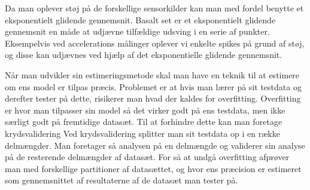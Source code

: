 \begin{description}[style=nextline]
\item[Eksponentielt glidende gennemsnit]
Da man oplever støj på de forskellige sensorkilder kan man med fordel benytte et eksponentielt glidende gennemsnit.
Basalt set er et eksponentielt glidende gennemsnit en måde at udjævne tilfældige udsving i en serie af punkter.
Eksempelvis ved accelerations målinger oplever vi enkelte spikes på grund af støj, og disse kan udjævnes ved hjælp af det eksponentielle glidende gennemsnit.

\item[Krydsvalidering]
Når man udvikler sin estimeringsmetode skal man have en teknik til at estimere om ens model er tilpas præcis.
Problemet er at hvis man lærer på sit testdata og derefter tester på dette, risikerer man hvad der kaldes for overfitting.
Overfitting er hvor man tilpasser sin model så det virker godt på ens testdata, men ikke særligt godt på fremtidige datasæt.
Til at forhindre dette kan man foretage krydsvalidering
Ved krydsvalidering splitter man sit testdata op i en række delmængder.
Man foretager så analysen på en delmængde og validerer sin analyse på de resterende delmængder af datasæt.
For så at undgå overfitting afprøver man med forskellige partitioner af datasættet, og hvor ens præcision er estimeret som gennemsnittet af resultaterne af de datasæt man tester på.

\end{description}